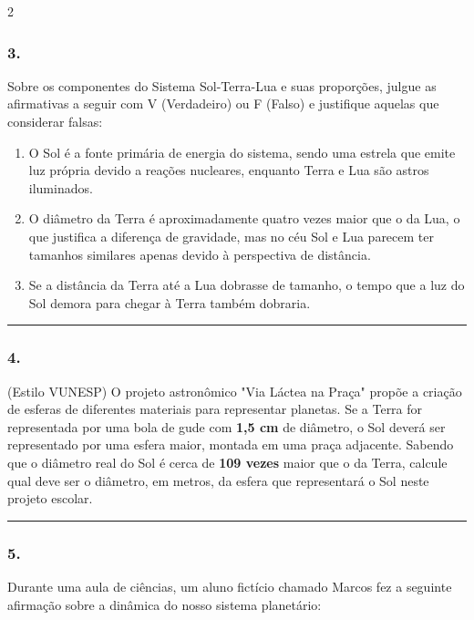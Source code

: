 \documentclass[twoside, 10pt, a4paper]{article}
\newlength{\espacoPreQuestao}
\newlength{\espacoQuestao}
\newlength{\espacoAlt}
\begin{document}
\begin{multicols*}{2}
\subsubsection*{3.} Sobre os componentes do Sistema Sol-Terra-Lua e suas proporções, julgue as afirmativas a seguir com V (Verdadeiro) ou F (Falso) e justifique aquelas que considerar falsas:
\begin{enumerate}[label=\Roman*., itemsep=\espacoAlt]
    \item O Sol é a fonte primária de energia do sistema, sendo uma estrela que emite luz própria devido a reações nucleares, enquanto Terra e Lua são astros iluminados.
    \item O diâmetro da Terra é aproximadamente quatro vezes maior que o da Lua, o que justifica a diferença de gravidade, mas no céu Sol e Lua parecem ter tamanhos similares apenas devido à perspectiva de distância.
    \item Se a distância da Terra até a Lua dobrasse de tamanho, o tempo que a luz do Sol demora para chegar à Terra também dobraria.
\end{enumerate}
\par\vspace{\espacoQuestao}

\noindent\textcolor{CorLinha}{\rule{\linewidth}{0.5pt}} 
\par\vspace{\espacoPreQuestao}
\subsubsection*{4.} (Estilo VUNESP) O projeto astronômico "Via Láctea na Praça" propõe a criação de esferas de diferentes materiais para representar planetas. Se a Terra for representada por uma bola de gude com \textbf{1,5 cm} de diâmetro, o Sol deverá ser representado por uma esfera maior, montada em uma praça adjacente. Sabendo que o diâmetro real do Sol é cerca de \textbf{109 vezes} maior que o da Terra, calcule qual deve ser o diâmetro, em metros, da esfera que representará o Sol neste projeto escolar.
\par\vspace{\espacoQuestao}

\noindent\textcolor{CorLinha}{\rule{\linewidth}{0.5pt}} 
\par\vspace{\espacoPreQuestao}
\subsubsection*{5.} Durante uma aula de ciências, um aluno fictício chamado Marcos fez a seguinte afirmação sobre a dinâmica do nosso sistema planetário: 


\end{multicols*}
\end{document}

